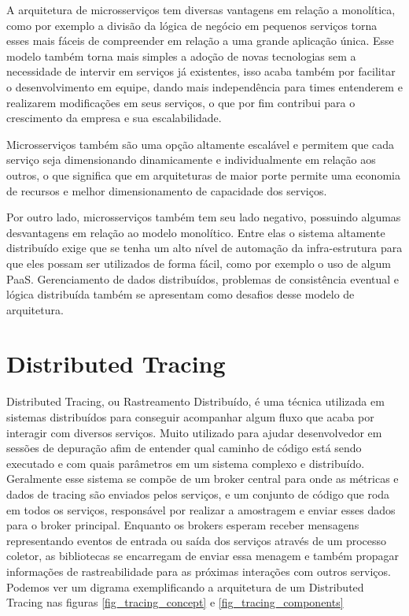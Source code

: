     A arquitetura de microsserviços tem diversas vantagens em relação a monolítica, como por exemplo a divisão da lógica de negócio em pequenos serviços torna esses mais fáceis de compreender em relação a uma grande aplicação única. Esse modelo também torna mais simples a adoção de novas tecnologias sem a necessidade de intervir em serviços já existentes, isso acaba também por facilitar o desenvolvimento em equipe, dando mais independência para times entenderem e realizarem modificações em seus serviços, o que por fim contribui para o crescimento da empresa e sua escalabilidade.\cite{microservices-intro}
    
    Microsserviços também são uma opção altamente escalável e permitem que cada serviço seja dimensionando dinamicamente e individualmente em relação aos outros, o que significa que em arquiteturas de maior porte permite uma economia de recursos e melhor dimensionamento de capacidade dos serviços.
    
    Por outro lado, microsserviços também tem seu lado negativo, possuindo algumas desvantagens em relação ao modelo monolítico. Entre elas o sistema altamente distribuído exige que se tenha um alto nível de automação da infra-estrutura para que eles possam ser utilizados de forma fácil, como por exemplo o uso de algum PaaS. Gerenciamento de dados distribuídos, problemas de consistência eventual e lógica distribuída também se apresentam como desafios desse modelo de arquitetura.

	\section{Distributed Tracing}
	
	Distributed Tracing, ou Rastreamento Distribuído, é uma técnica utilizada em sistemas distribuídos para conseguir acompanhar algum fluxo que acaba por interagir com diversos serviços. Muito utilizado para ajudar desenvolvedor em sessões de depuração afim de entender qual caminho de código está sendo executado e com quais parâmetros em um sistema complexo e distribuído. Geralmente esse sistema se compõe de um broker central para onde as métricas e dados de tracing são enviados pelos serviços, e um conjunto de código que roda em todos os serviços, responsável por realizar a amostragem e enviar esses dados para o broker principal. Enquanto os brokers esperam receber mensagens representando eventos de entrada ou saída dos serviços através de um processo coletor, as bibliotecas se encarregam de enviar essa menagem e também propagar informações de rastreabilidade para as próximas interações com outros serviços. Podemos ver um digrama exemplificando a arquitetura de um Distributed Tracing nas figuras \ref{fig_tracing_concept} e \ref{fig_tracing_components}
	
